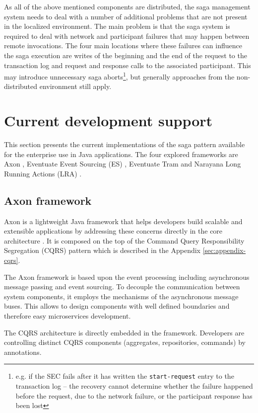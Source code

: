 \documentclass[oneside,
  digital, %
  table,   %
  lof,     %
  lot,     %
]{fithesis3}
\begin{document}
As all of the above mentioned components are distributed, the saga management system needs to deal with a number of additional problems that are not present in the localized environment. The main problem is that the saga system is required to deal with network and participant failures that may happen between remote invocations. The four main locations where these failures can influence the saga execution are writes of the beginning and the end of the request to the transaction log and request and response calls to the associated participant. This may introduce unnecessary saga aborts\footnote{e.g. if the SEC fails after it has written the \texttt{start-request} entry to the transaction log -- the recovery cannot determine whether the failure happened before the request, due to the network failure, or the participant response has been lost}, but generally approaches from the non-distributed environment still apply.

\section{Current development support}

This section presents the current implementations of the saga pattern available for the enterprise use in Java applications. The four explored frameworks are Axon \cite{axon_framework}, Eventuate Event Sourcing (ES) \cite{eventuate.io}, Eventuate Tram \cite{eventuate-tram} and Narayana Long Running Actions (LRA) \cite{narayana_lra}.

\subsection{Axon framework}

Axon is a lightweight Java framework that helps developers build scalable and extensible applications by addressing these concerns directly in the core architecture \cite{axon_framework}. It is composed on the top of the Command Query Responsibility Segregation (CQRS) pattern which is described in the Appendix \ref{sec:appendix-cqrs}.

The Axon framework is based upon the event processing including asynchronous message passing and event sourcing. To decouple the communication between system components, it employs the mechanisms of the asynchronous message buses. This allows to design components with well defined boundaries and therefore easy microservices development.

The CQRS architecture is directly embedded in the framework. Developers are controlling distinct CQRS components (aggregates, repositories, commands) by annotations. 
\end{document}

